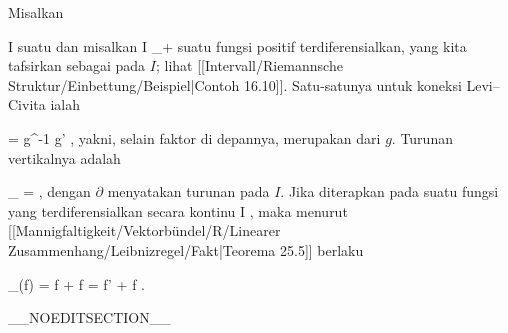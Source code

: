 {

Misalkan

\mavergleichskette
{\vergleichskette
{ I
}
{ \subseteq }{ \R
}
{  }{
}
{    }{
}
{   }{
}
}
{}{}{}
suatu
dan misalkan
 { I } {\R_+
} {}
suatu fungsi positif terdiferensialkan, yang kita tafsirkan sebagai
pada $I$; lihat
[[Intervall/Riemannsche Struktur/Einbettung/Beispiel|Contoh 16.10]].
Satu-satunya
untuk koneksi Levi--Civita ialah

\mavergleichskettedisp
{\vergleichskette
{ \Gamma
}
{ =} { {  }  g^{-1} g'
}
{ } {
}
{ } {
}
{ } {
}
}
{}{}{,}
yakni, selain faktor di depannya, merupakan
dari $g$. Turunan vertikalnya adalah

\mavergleichskettedisp
{\vergleichskette
{ \nabla_\partial \partial
}
{ =} { {  } \partial
}
{ } {
}
{ } {
}
{ } {
}
}
{}{}{,}
dengan $\partial$ menyatakan turunan pada $I$. Jika diterapkan pada suatu fungsi yang terdiferensialkan secara kontinu
 { I } {\R
} {}
 {} {,}
maka menurut
[[Mannigfaltigkeit/Vektorbündel/R/Linearer Zusammenhang/Leibnizregel/Fakt|Teorema 25.5]]
berlaku

\mavergleichskettedisp
{\vergleichskette
{ \nabla_\partial (f)
}
{ =} { \partial f + f  {  }
}
{ =} { f' + f {  }
}
{ } {
}
{ } {
}
}
{}{}{.}

}

__NOEDITSECTION__

